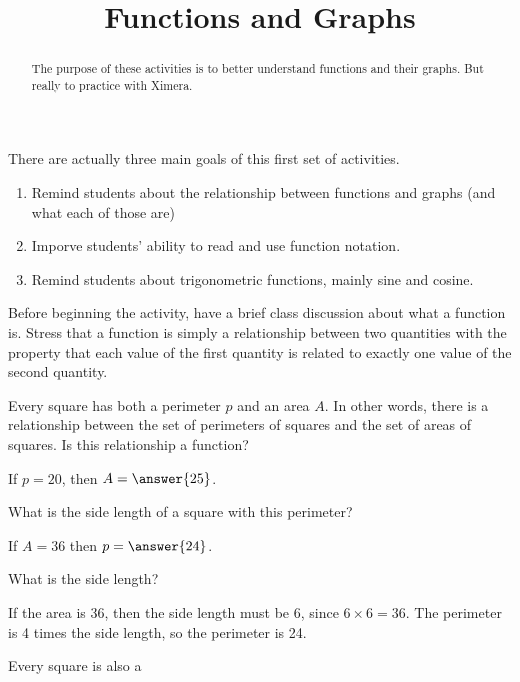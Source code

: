 \documentclass{ximera}
\title{Functions and Graphs}
\begin{document}
\begin{abstract}
The purpose of these activities is to better understand functions and their graphs.  But really to practice with Ximera.
\end{abstract}
\maketitle



\begin{instnote}
There are actually three main goals of this first set of activities.

\begin{enumerate}
\item Remind students about the relationship between functions and graphs (and what each of those are)
\item Imporve students' ability to read and use function notation.
\item Remind students about trigonometric functions, mainly sine and cosine.
\end{enumerate}

Before beginning the activity, have a brief class discussion about what a function is.  Stress that a function is simply a relationship between two quantities with the property that each value of the first quantity is related to exactly one value of the second quantity.

\end{instnote}


Every square has both a perimeter $p$ and an area $A$.  In other words, there is a relationship between the set of perimeters of squares and the set of areas of squares.  Is this relationship a function?

\begin{exercise}
If $p = 20$, then $A = \answer{25}$.
\begin{hint}
What is the side length of a square with this perimeter?
\end{hint}
\end{exercise}

\begin{exercise}
If $A = 36$ then $p = \answer{24}$.
\begin{hint}
What is the side length?
\end{hint}

\begin{solution}
If the area is 36, then the side length must be 6, since $6\times 6 = 36$.  The perimeter is 4 times the side length, so the perimeter is 24.
\end{solution}
\end{exercise}

\begin{question}

Every square is also a 

\end{question}
\end{document}
